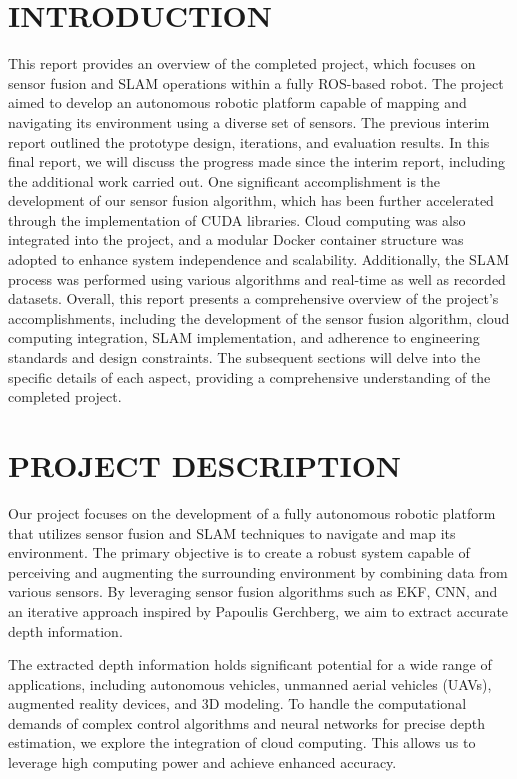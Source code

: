 \documentclass[12pt]{article}
\begin{document}
\section{INTRODUCTION}

This report provides an overview of the completed project, which focuses on sensor fusion and SLAM operations within a fully ROS-based robot. The project aimed to develop an autonomous robotic platform capable of mapping and navigating its environment using a diverse set of sensors. The previous interim report outlined the prototype design, iterations, and evaluation results. In this final report, we will discuss the progress made since the interim report, including the additional work carried out. One significant accomplishment is the development of our sensor fusion algorithm, which has been further accelerated through the implementation of CUDA libraries. Cloud computing was also integrated into the project, and a modular Docker container structure was adopted to enhance system independence and scalability. Additionally, the SLAM process was performed using various algorithms and real-time as well as recorded datasets. Overall, this report presents a comprehensive overview of the project's accomplishments, including the development of the sensor fusion algorithm, cloud computing integration, SLAM implementation, and adherence to engineering standards and design constraints. The subsequent sections will delve into the specific details of each aspect, providing a comprehensive understanding of the completed project. 


\section{PROJECT DESCRIPTION}

Our project focuses on the development of a fully autonomous robotic platform that utilizes sensor fusion and SLAM techniques to navigate and map its environment. The primary objective is to create a robust system capable of perceiving and augmenting the surrounding environment by combining data from various sensors. By leveraging sensor fusion algorithms such as EKF, CNN, and an iterative approach inspired by Papoulis Gerchberg, we aim to extract accurate depth information. 

The extracted depth information holds significant potential for a wide range of applications, including autonomous vehicles, unmanned aerial vehicles (UAVs), augmented reality devices, and 3D modeling. To handle the computational demands of complex control algorithms and neural networks for precise depth estimation, we explore the integration of cloud computing. This allows us to leverage high computing power and achieve enhanced accuracy. 
\end{document}
